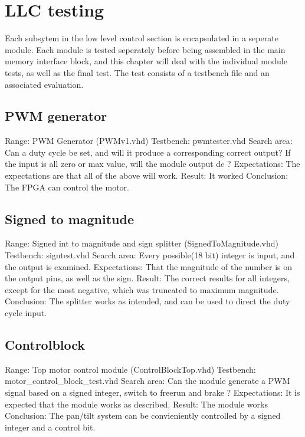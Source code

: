 \section{LLC testing}
Each subsytem in the low level control section is encapsulated in a seperate module.
Each module is tested seperately before being assembled in the main memory interface block, and this chapter will deal with the individual module tests, as well as the final test.
The test consists of a testbench file and an associated evaluation.

\subsection{PWM generator}
Range:                  PWM Generator (PWMv1.vhd)
Testbench: 				pwmtester.vhd
Search area:            Can a duty cycle be set, and will it produce a corresponding correct output?
						If the input is all zero or max value, will the module output dc ?
Expectations:           The expectations are that all of the above will work.
Result:                 It worked
Conclusion:             The FPGA can control the motor. 

\subsection{Signed to magnitude}
Range:                  Signed int to magnitude and sign splitter (SignedToMagnitude.vhd)
Testbench: 				signtest.vhd
Search area:            Every possible(18 bit) integer is input, and the output is examined.
Expectations:           That the magnitude of the number is on the output pins, as well as the sign.
Result:                 The correct results for all integers, except for the most negative, which was truncated to maximum magnitude.
Conclusion:             The splitter works as intended, and can be used to direct the duty cycle input. 

\subsection{Controlblock}
Range:                  Top motor control module (ControlBlockTop.vhd)
Testbench: 				motor\_control\_block\_test.vhd
Search area:            Can the module generate a PWM signal based on a signed integer, switch to freerun and brake ?
Expectations:           It is expected that the module works as described.
Result:                 The module works
Conclusion:             The pan/tilt system can be convieniently controlled by a signed integer and a control bit.

